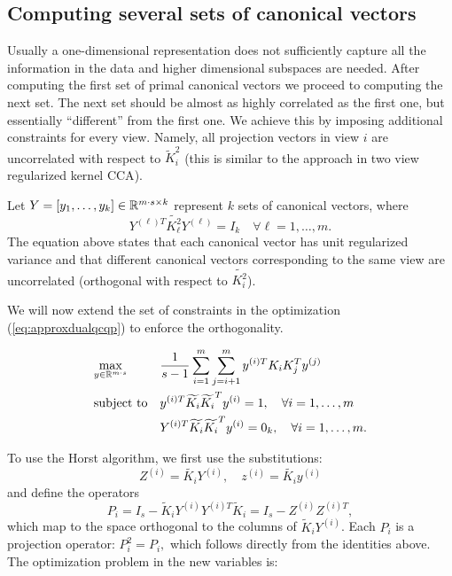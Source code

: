 \subsection{Computing several sets of canonical vectors}\label{chap:extensions:severalCanonicalVectors}
Usually a one-dimensional representation does not sufficiently capture
all the information in the data and higher dimensional subspaces are
needed. After computing the first set of primal canonical vectors we
proceed to computing the next set. The next set should be almost as
highly correlated as the first one, but essentially ``different'' from
the first one. We achieve this by imposing additional constraints for
every view. Namely, all projection vectors in view $i$ are
uncorrelated with respect to $\widetilde{K}_i^2$ (this is similar to
the approach in two view regularized kernel CCA\cite{FBMJ}).
\par
Let $Y = \left[y_1, \ldots, y_k\right] \in \mathbb{R}^{m\cdot s  \times k}$ 
represent $k$ sets of canonical vectors, where 
$$Y^{(\ell)T} \widetilde{K_{\ell}^2} Y^{(\ell)} = I_k  \quad\forall \ell = 1,\ldots, m. $$
The equation above states that each canonical vector has unit regularized variance 
and that different canonical vectors corresponding to the same view are 
uncorrelated (orthogonal with respect to $\widetilde{K_i^2}$).

We will now extend the set of constraints in the optimization (\ref{eq:approxdualqcqp}) 
to enforce the orthogonality.

 \begin{equation}\label{eq:kdimapproxdualqcqp}
\begin{aligned}
& \underset{y \in \mathbb{R}^{m\cdot s}}{\text{max}}
& & \frac{1}{s -1} \sum_{i = 1}^m \sum_{j = i+1}^m y^{(i)T} K_i K_j^T y^{(j)}\\
& \text{subject to}
& & y^{(i)T} \widetilde{K_i} \widetilde{K_i}^T y^{(i)} = 1, \quad\forall i = 1,\ldots, m\\
& & & Y^{(i)T} \widetilde{K_i} \widetilde{K_i}^T y^{(i)} = 0_k, \quad\forall i = 1,\ldots, m.
\end{aligned}
\end{equation}

To use the Horst algorithm, we first use the substitutions:
$$Z^{(i)} = \widetilde{K_i}Y^{(i)}, \quad z^{(i)} = \widetilde{K_i}y^{(i)}$$
and define the operators $$P_i = I_s - \widetilde{K}_i Y^{(i)} Y^{(i)T} \widetilde{K}_i = I_s - Z^{(i)} Z^{(i)T},$$ 
which map to the space orthogonal to the columns of $\widetilde{K}_i Y^{(i)}$. 
Each $P_i$ is a projection operator: $P_i^2 = P_i,$ which follows directly from the identities above.
The optimization problem in the new variables is:

